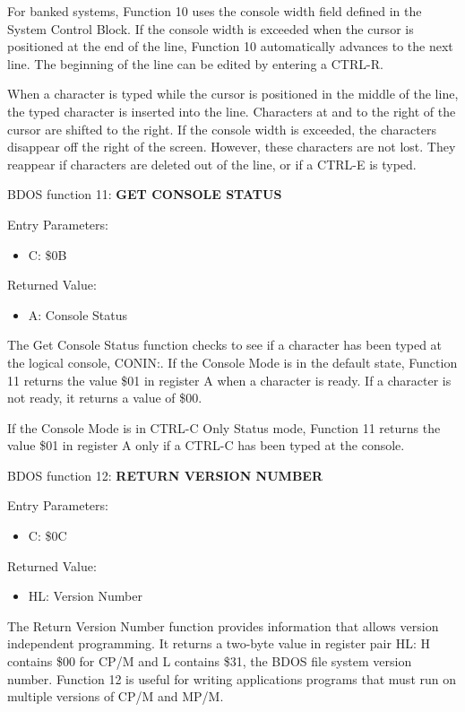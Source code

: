 For banked systems, Function 10 uses the console width field defined
in the System Control Block. If the console width is exceeded when the
cursor is positioned at the end of the line, Function 10 automatically
advances to the next line. The beginning of the line can be edited by
entering a CTRL-R.

When a character is typed while the cursor is positioned in the middle
of the line, the typed character is inserted into the line. Characters
at and to the right of the cursor are shifted to the right. If the
console width is exceeded, the characters disappear off the right of
the screen. However, these characters are not lost. They reappear if
characters are deleted out of the line, or if a CTRL-E is typed.

BDOS function 11: \textbf{GET CONSOLE STATUS}

Entry Parameters:
\begin{itemize}
\item[] C: \$0B
\end{itemize}

Returned Value:
\begin{itemize}
\item[] A: Console Status
\end{itemize}

The Get Console Status function checks to see if a character has been
typed at the logical console, CONIN:. If the Console Mode is in the
default state, Function 11 returns the value \$01 in register A when a
character is ready. If a character is not ready, it returns a value of
\$00.

If the Console Mode is in CTRL-C Only Status mode, Function 11 returns
the value \$01 in register A only if a CTRL-C has been typed at the
console.

BDOS function 12: \textbf{RETURN VERSION NUMBER}

Entry Parameters:
\begin{itemize}
\item[] C: \$0C
\end{itemize}

Returned Value:
\begin{itemize}
\item[] HL: Version Number
\end{itemize}

The Return Version Number function provides information that allows
version independent programming. It returns a two-byte value in
register pair HL: H contains \$00 for CP/M and L contains \$31, the
BDOS file system version number.  Function 12 is useful for writing
applications programs that must run on multiple versions of CP/M and
MP/M.

